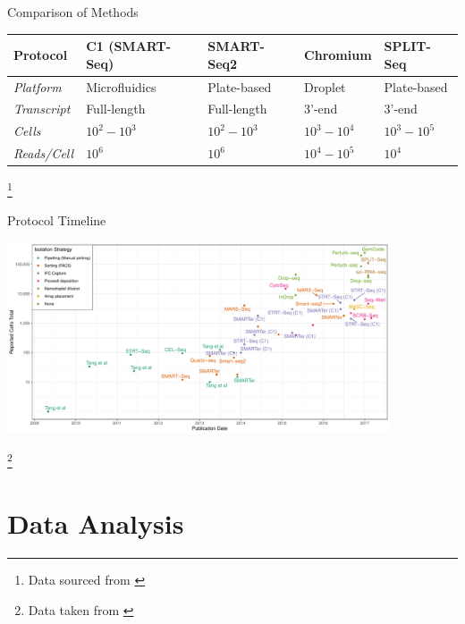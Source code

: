 \documentclass[aspectratio=169,11pt]{beamer}
\newcommand\blfootnote[1]{%
  \begingroup
  \renewcommand\thefootnote{}\footnote{#1}%
  \addtocounter{footnote}{-1}%
  \endgroup
}
\begin{document}
\begin{frame}{Comparison of Methods}

	\begin{center}
	
		\small
		\begin{tabular}{l|llll}
			\textbf{Protocol} & \textbf{C1 (SMART-Seq)} & \textbf{SMART-Seq2} & \textbf{Chromium} & \textbf{SPLIT-Seq}\\
			\midrule
			\textit{Platform} & Microfluidics & Plate-based & Droplet & Plate-based\\
			\textit{Transcript} & Full-length & Full-length & 3'-end & 3'-end\\
			\textit{Cells} & $10^2 - 10^3$ & $10^2 - 10^3$ & $10^3-10^4$ & $10^3 - 10^5$\\
			\textit{Reads/Cell} & $10^6$ & $10^6$ & $10^4-10^5$ & $10^4$\\
			\bottomrule
		\end{tabular}

	\end{center}

	\blfootnote{Data sourced from \cite{pmid28821273}}

\end{frame}

\begin{frame}{Protocol Timeline}

	\begin{center}
		\includegraphics[width=0.85\textwidth]{figures/scRNATimeline.pdf} 
	\end{center}

	\blfootnote{Data taken from \cite{pmid29494575}}

\end{frame}


\section{Data Analysis}
\end{document}
